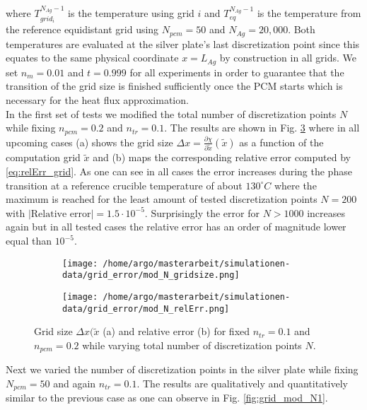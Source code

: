 \documentclass{scrartcl}[12pt, halfparskip]
\numberwithin{equation}{section}
\numberwithin{figure}{section}
\numberwithin{table}{section}
\begin{document}
where $T_{grid_i}^{N_{Ag}-1}$ is the temperature using grid $i$ and $T_{eq}^{N_{Ag}-1}$ is the temperature from the reference equidistant grid using $N_{pcm}=50$ and $N_{Ag}=20,000$. Both temperatures are evaluated at the silver plate's last discretization point since this equates to the same physical coordinate $x=L_{Ag}$ by construction in all grids. 
We set $n_m=0.01$ and $t=0.999$ for all experiments in order to guarantee that the transition of the grid size is finished sufficiently once the PCM starts which is necessary for the heat flux approximation. \\
In the first set of tests we modified the total number of discretization points $N$ while fixing $n_{pcm}=0.2$ and $n_{tr}=0.1$. The results are shown in Fig. \ref{fig:grid_mod_N} where in all upcoming cases (a) shows the grid size $\Delta x = \frac{\partial \chi}{\partial \tilde{x}}(\tilde{x})$ as a function of the computation grid $\tilde{x}$ and (b) maps the corresponding relative error computed by \eqref{eq:relErr_grid}. As one can see in all cases the error increases during the phase transition at a reference crucible temperature of about $130^{\circ} C$ where the maximum is reached for the least amount of tested discretization points $N=200$ with $|\text{Relative error|}=1.5 \cdot 10^{-5}$. Surprisingly the error for $N > 1000$ increases again but in all tested cases the relative error has an order of magnitude lower equal than $10^{-5}$. 


\begin{figure}[H]
	\begin{subfigure}{0.49\textwidth}
		\texttt{[image: /home/argo/masterarbeit/simulationen-data/grid\_error/mod\_N\_gridsize.png]}
		\caption{}
		\label{fig:gridsize_mod_N}
	\end{subfigure}
	\begin{subfigure}{0.49\textwidth}
		\texttt{[image: /home/argo/masterarbeit/simulationen-data/grid\_error/mod\_N\_relErr.png]}
		\caption{}
		\label{fig:grid_relErr_mod_N}
	\end{subfigure}
	\caption{Grid size $\Delta x(\tilde{x}$ (a) and relative error (b) for fixed $n_{tr}=0.1$ and $n_{pcm}=0.2$ while varying total number of discretization points $N$.}
	\label{fig:grid_mod_N}
\end{figure}

Next we varied the number of discretization points in the silver plate while fixing $N_{pcm}=50$ and again $n_{tr}=0.1$. The results are qualitatively and quantitatively similar to the previous case as one can observe in Fig. \ref{fig:grid_mod_N1}.
\end{document}
